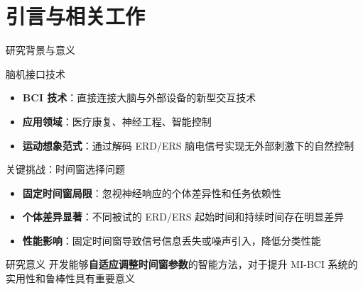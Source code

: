 \section{引言与相关工作}

\begin{frame}{研究背景与意义}
    \begin{block}{\normalsize 脑机接口技术}
        \begin{itemize}
            \item[\textcolor{primaryblue}{\textbullet}] \textbf{BCI 技术}：直接连接大脑与外部设备的新型交互技术
            \item[\textcolor{primaryblue}{\textbullet}] \textbf{应用领域}：医疗康复、神经工程、智能控制
            \item[\textcolor{primaryblue}{\textbullet}] \textbf{运动想象范式}：通过解码 ERD/ERS 脑电信号实现无外部刺激下的自然控制
        \end{itemize}
    \end{block}

    \vspace{0.3em}

    \begin{alertblock}{\normalsize 关键挑战：时间窗选择问题}
        \begin{itemize}
            \item[\textcolor{accentred}{\textbullet}] \textbf{固定时间窗局限}：忽视神经响应的个体差异性和任务依赖性
            \item[\textcolor{accentred}{\textbullet}] \textbf{个体差异显著}：不同被试的 ERD/ERS 起始时间和持续时间存在明显差异
            \item[\textcolor{accentred}{\textbullet}] \textbf{性能影响}：固定时间窗导致信号信息丢失或噪声引入，降低分类性能
        \end{itemize}
    \end{alertblock}

    \vspace{0.3em}

    \begin{exampleblock}{\normalsize 研究意义}
        开发能够\textbf{自适应调整时间窗参数}的智能方法，对于提升 MI-BCI 系统的实用性和鲁棒性具有重要意义
    \end{exampleblock}
\end{frame}

